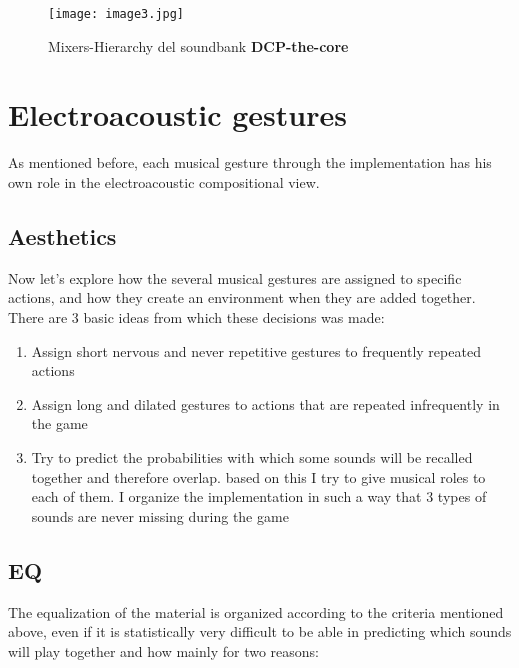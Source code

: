 	\begin{figure}[h]
		\begin{center}
			\texttt{[image: image3.jpg]}
			\caption{Mixers-Hierarchy del soundbank \textbf{DCP-the-core}}
		\end{center}
	\end{figure}

\section{Electroacoustic gestures}
As mentioned before, each musical gesture through the implementation has his own role in the electroacoustic compositional view.

	\subsection{Aesthetics}
	Now let's explore how the several musical gestures are assigned to specific actions, and how they create an environment when they are added together. There are 3 basic ideas from which these decisions was made:
		\begin{enumerate}
			\item Assign short nervous and never repetitive gestures to frequently repeated actions
			\item Assign long and dilated gestures to actions that are repeated infrequently in the game
			\item Try to predict the probabilities with which some sounds will be recalled together and therefore overlap. based on this I try to give musical roles to each of them. I organize the implementation in such a way that 3 types of sounds are never missing during the game
		\end{enumerate}
	
	\subsection{EQ}
	The equalization of the material is organized according to the criteria mentioned above, even if it is statistically very difficult to be able in predicting which sounds will play together and how mainly for two reasons:
	
